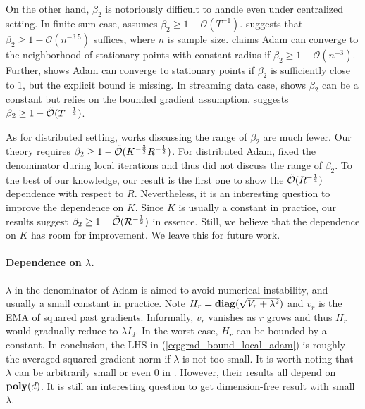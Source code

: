 \documentclass{article} %
\numberwithin{equation}{section}
\renewcommand{\eqref}[1]{(\ref{#1})}
\begin{document}
On the other hand, $\beta_2$ is notoriously difficult to handle even under centralized setting. 
In finite sum case, \cite{zou2019sufficient} assumes $\beta_2\geq 1-\mathcal{O}(T^{-1})$.
\cite{shi2020rmsprop} suggests that $\beta_2\geq 1-\mathcal{O}(n^{-3.5})$ suffices, where $n$ is sample size.
\cite{zhang2022adam} claims Adam can converge to the neighborhood of stationary points with constant radius if $\beta_2\geq 1-\mathcal{O}(n^{-3})$. 
Further, \cite{wang2022provable} shows Adam can converge to stationary points if $\beta_2$ is sufficiently close to $1$, but the explicit bound is missing.
In streaming data case, \cite{defossez2020simple} shows $\beta_2$ can be a constant but relies on the bounded gradient assumption. \citep{li2024convergence} suggests $\beta_2\geq 1-\Tilde{\mathcal{O}}(T^{-\frac{1}{2}})$. 

As for distributed setting, works discussing the range of $\beta_2$ are much fewer.
Our theory requires $\beta_2\geq 1-\Tilde{\mathcal{O}}(K^{-\frac{3}{2}}R^{-\frac{1}{2}})$. 
For distributed Adam, \cite{karimireddy2020mime, zhao2022communication} fixed the denominator during local iterations and thus did not discuss the range of $\beta_2$.
To the best of our knowledge, our result is the first one to show the $\Tilde{\mathcal{O}}(R^{-\frac{1}{2}})$ dependence with respect to $R$.
Nevertheless, it is an interesting question to improve the dependence on $K$.
Since $K$ is usually a constant in practice, our results suggest $\beta_2\geq 1-\Tilde{\mathcal{O}}(\mathcal{R}^{-\frac{1}{2}})$ in essence. 
Still, we believe that the dependence on $K$ has room for improvement.
We leave this for future work.

\paragraph{Dependence on $\lambda$.}
$\lambda$ in the denominator of Adam is aimed to avoid numerical instability, and usually a small constant in practice. 
Note $H_r= \mbox{\bf diag}(\sqrt{V_r+\lambda^2})$ and $v_r$ is the EMA of squared past gradients.
Informally, $v_r$ vanishes as $r$ grows and thus $H_r$ would gradually reduce to $\lambda I_d$. 
In the worst case, $H_r$ can be bounded by a constant.
In conclusion, the LHS in \eqref{eq:grad_bound_local_adam} is roughly the averaged squared gradient norm if $\lambda$ is not too small.
It is worth noting that $\lambda$ can be arbitrarily small or even $0$ in \citep{defossez2020simple, wang2022provable, wang2024closing}. 
However, their results all depend on $\textbf{poly}(d)$. 
It is still an interesting question to get dimension-free result with small $\lambda$. 
\end{document}
